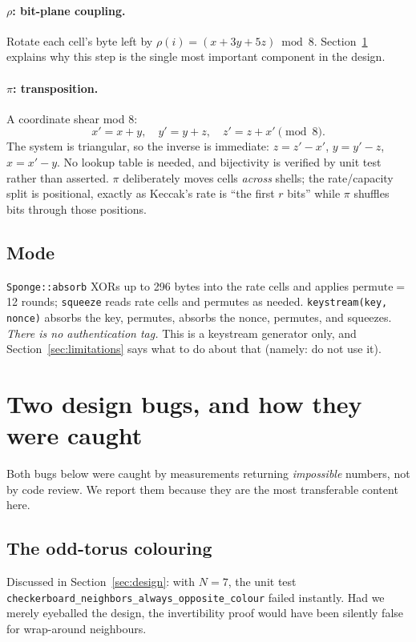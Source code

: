 \documentclass[11pt,a4paper]{article}
\theoremstyle{plain}
\theoremstyle{definition}
\theoremstyle{remark}
\begin{document}
\paragraph{$\rho$: bit-plane coupling.} Rotate each cell's byte left by
$\rho(i) = (x + 3y + 5z) \bmod 8$. Section~\ref{sec:bugs} explains why this step is
the single most important component in the design.

\paragraph{$\pi$: transposition.} A coordinate shear mod 8:
\[
  x' = x + y,\quad y' = y + z,\quad z' = z + x' \pmod 8.
\]
The system is triangular, so the inverse is immediate: $z = z' - x'$, $y = y' - z$,
$x = x' - y$. No lookup table is needed, and bijectivity is verified by unit test
rather than asserted. $\pi$ deliberately moves cells \emph{across} shells; the
rate/capacity split is positional, exactly as Keccak's rate is ``the first $r$ bits''
while $\pi$ shuffles bits through those positions.

\subsection{Mode}

\texttt{Sponge::absorb} XORs up to 296 bytes into the rate cells and applies
$\mathrm{permute} = $ 12 rounds; \texttt{squeeze} reads rate cells and permutes as
needed. \texttt{keystream(key, nonce)} absorbs the key, permutes, absorbs the nonce,
permutes, and squeezes. \emph{There is no authentication tag.} This is a keystream
generator only, and Section~\ref{sec:limitations} says what to do about that (namely:
do not use it).

\section{Two design bugs, and how they were caught}
\label{sec:bugs}

Both bugs below were caught by measurements returning \emph{impossible} numbers, not
by code review. We report them because they are the most transferable content here.

\subsection{The odd-torus colouring}

Discussed in Section~\ref{sec:design}: with $N=7$, the unit test
\texttt{checkerboard\_neighbors\_always\_opposite\_colour} failed instantly. Had we
merely eyeballed the design, the invertibility proof would have been silently false
for wrap-around neighbours.
\end{document}
